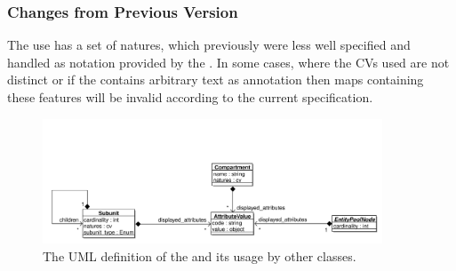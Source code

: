 


\subsubsection{Changes from Previous Version}

The use  has a set of natures, which previously
were less well specified and handled as notation provided by the
.  In some cases, where the CVs used are
not distinct or if the  contains arbitrary
text as annotation then maps containing these features will be invalid
according to the current specification.

\label{defn:AttributeValue}

\begin{figure}[htb]
  \centering
  \includegraphics[width = 0.9\textwidth]{images/attributevalueuml}
  \caption{The UML definition of the  and
    its usage by other classes.}
  \label{fig:techref:attributevalueuml}
\end{figure}


